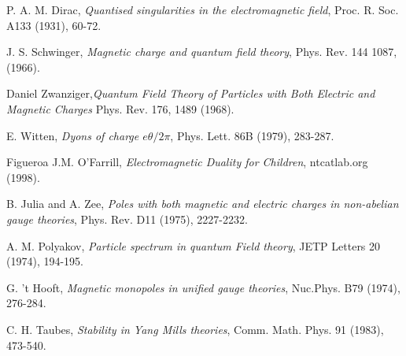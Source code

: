 \clearpage
{}
{}


\begin{thebibliography}{99}


P. A. M. Dirac,
\emph{Quantised singularities in the electromagnetic field}, Proc. R. Soc. A133 (1931), 60-72.

J. S. Schwinger, \emph{Magnetic charge and quantum field theory}, Phys. Rev. 144 1087, (1966).

Daniel Zwanziger,\emph{Quantum Field Theory of Particles with Both Electric and Magnetic Charges} Phys. Rev. 176, 1489 (1968).

E. Witten,
\emph{Dyons of charge $e\theta/2\pi$}, Phys. Lett. 86B (1979), 283-287.

Figueroa J.M. O'Farrill, \emph{Electromagnetic Duality for Children}, ntcatlab.org
(1998).

B. Julia and A. Zee, \emph{Poles with both magnetic and electric charges
in non-abelian gauge theories}, Phys. Rev. D11 (1975), 2227-2232.

A. M. Polyakov, \emph{Particle spectrum in quantum Field theory}, JETP Letters 20 (1974), 194-195.

G. 't Hooft, \emph{Magnetic monopoles in unified gauge theories}, Nuc.Phys. B79 (1974), 276-284.

C. H. Taubes, \emph{Stability in Yang Mills theories}, Comm. Math.
Phys. 91 (1983), 473-540.

\end{thebibliography}